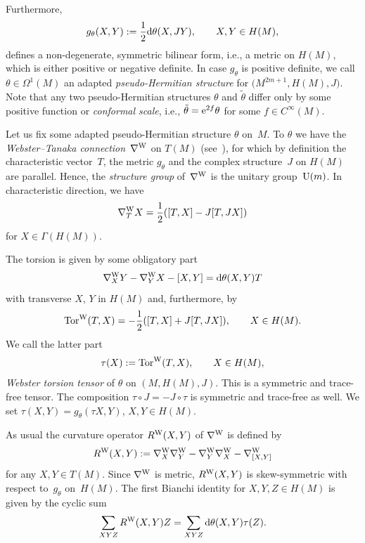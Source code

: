 \documentclass[10pt,a4paper]{amsart}
\numberwithin{equation}{section}
\begin{document}
Furthermore,
\[
g_\theta(X,Y) := \frac{1}{2}{\rm d}\theta(X, JY),\qquad X,Y\in H(M),\]
defines a non-degenerate, symmetric bilinear form, i.e., a metric on $H(M)$, which is
either positive or negative definite.
In case $g_\theta$ is positive definite, we call $\theta\in\Omega^1(M)$ an adapted {\em pseudo-Hermitian structure} for $\big(M^{2m+1}, H(M), J\big)$. Note that any two pseudo-Hermitian structures $\theta$ and $\tilde{\theta}$
differ only by some positive function or {\em conformal scale}, i.e., $\tilde{\theta}={\rm e}^{2f}\theta$ for some $f\in C^\infty(M)$.

Let us fix some adapted pseudo-Hermitian structure $\theta$ on~$M$. To $\theta$ we have the {\em Webster--Tanaka connection}~$\nabla^{\rm W}$ on $T(M)$ (see~\cite{Tan,Web}),
for which by definition the characteristic vector~$T$, the metric $g_\theta$ and the complex structure~$J$ on $H(M)$ are parallel.
Hence, the {\em structure group} of~$\nabla^{\rm W}$ is the unitary group~${\rm U}(m)$.
In characteristic direction, we have
\begin{equation*} \label{WTC} \nabla^{\rm W}_{T}X = \frac{1}{2} ([T,X]-J[T,JX] )\end{equation*}
for $X\in\Gamma(H(M))$.

The torsion is given by some obligatory part
 \[ \nabla^{\rm W}_XY-\nabla^{\rm W}_YX - [X,Y] ={\rm d}\theta(X,Y)T \]
with transverse $X$, $Y$ in $H(M)$ and, furthermore, by
\begin{gather*}%
\operatorname{Tor}^{\rm W}(T,X) = -\frac{1}{2} ([T,X]+J[T,JX] ),\qquad X\in H(M) . \end{gather*}
We call the latter part
\[
\tau(X) := \operatorname{Tor}^{\rm W}(T,X),\qquad X\in H(M),
\]
{\em Webster torsion tensor} of $\theta$ on $(M,H(M),J)$.
This is a symmetric and trace-free tensor. The composition $\tau\circ J=-J\circ \tau$ is symmetric and trace-free as well.
We set $\tau(X,Y)=g_\theta(\tau X,Y)$, $X,Y\in H(M)$.

As usual the curvature operator $R^{\rm W}(X,Y)$ of $\nabla^{\rm W}$ is defined by
\[
R^{\rm W}(X,Y) := \nabla^{\rm W}_X\nabla^{\rm W}_Y- \nabla^{\rm W}_Y\nabla^{\rm W}_X- \nabla^{\rm W}_{[X,Y]}
\]
for any $X,Y\in T(M)$. Since $\nabla^{\rm W}$ is metric,
$R^{\rm W}(X,Y)$ is skew-symmetric with respect to~$g_\theta$ on~$H(M)$.
The first Bianchi identity for $X,Y,Z\in H(M)$ is given by the cyclic sum
\begin{equation}\label{bianchi}
\sum_{XYZ}R^{\rm W}(X,Y)Z = \sum_{XYZ} {\rm d}\theta(X,Y)\tau(Z) .
\end{equation}
\end{document}
